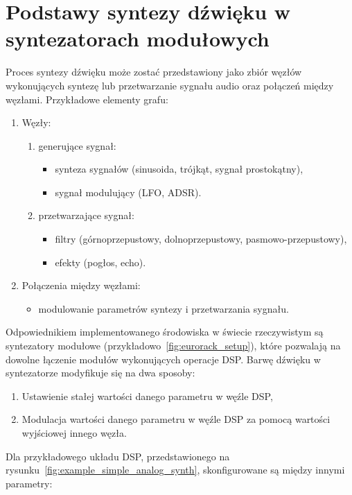 \section{Podstawy syntezy dźwięku w syntezatorach modułowych}

Proces syntezy dźwięku może zostać przedstawiony jako zbiór węzłów wykonujących syntezę lub
przetwarzanie sygnału audio oraz połączeń między węzłami. Przykładowe elementy grafu:

\begin{enumerate}
  \item Węzły:
    \begin{enumerate}
      \item generujące sygnał:
        \begin{itemize}
          \item synteza sygnałów (sinusoida, trójkąt, sygnał prostokątny),
          \item sygnał modulujący (LFO, ADSR).
        \end{itemize}
      \item przetwarzające sygnał:
        \begin{itemize}
          \item filtry (górnoprzepustowy, dolnoprzepustowy, pasmowo-przepustowy),
          \item efekty (pogłos, echo).
        \end{itemize}
    \end{enumerate}
  \item Połączenia między węzłami:
    \begin{itemize}
      \item modulowanie parametrów syntezy i przetwarzania sygnału.
    \end{itemize}
\end{enumerate}

\noindent
Odpowiednikiem implementowanego środowiska w świecie rzeczywistym są syntezatory modułowe (przykładowo~\ref{fig:eurorack_setup}),
które pozwalają na dowolne łączenie modułów wykonujących operacje DSP.
Barwę dźwięku w syntezatorze modyfikuje się na dwa sposoby:
\begin{enumerate}
  \item Ustawienie stałej wartości danego parametru w węźle DSP,
  \item Modulacja wartości danego parametru w węźle DSP za pomocą wartości wyjściowej innego węzła.
\end{enumerate}

\noindent
Dla przykładowego układu DSP, przedstawionego na rysunku~\ref{fig:example_simple_analog_synth},
skonfigurowane są między innymi parametry:

